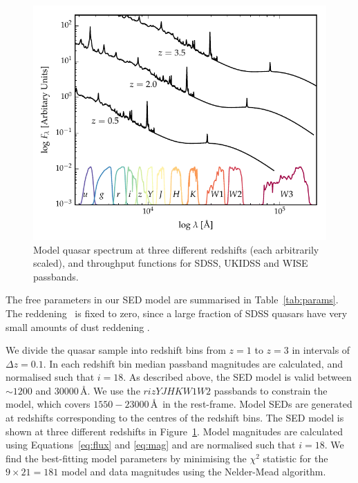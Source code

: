 \begin{figure}
  \centering
  \includegraphics[width=\textwidth]{figures/chapter05/throughput.pdf}
  \caption[{Model quasar spectrum at three different redshifts, and throughput functions for SDSS, UKIDSS and WISE passbands.}]{Model quasar spectrum at three different redshifts (each arbitrarily scaled), and throughput functions for SDSS, UKIDSS and WISE passbands.}
  \label{fig:filters}
\end{figure}

The free parameters in our SED model are summarised in Table~\ref{tab:params}. 
The reddening \ebv\, is fixed to zero, since a large fraction of SDSS quasars have very small amounts of dust reddening \citep{richards03}. 

We divide the quasar sample into redshift bins from $z=1$ to $z=3$ in intervals of $\Delta z = 0.1$.
In each redshift bin median passband magnitudes are calculated, and normalised such that $i=18$.
As described above, the SED model is valid between $\sim1200$ and $30000$\,\AA.  
We use the $rizYJHKW1W2$ passbands to constrain the model, which covers $1550-23000$\,\AA\, in the rest-frame. 
Model SEDs are generated at redshifts corresponding to the centres of the redshift bins.
The SED model is shown at three different redshifts in Figure~\ref{fig:filters}.
Model magnitudes are calculated using Equations~\ref{eq:flux} and \ref{eq:mag} and are normalised such that $i=18$.
We find the best-fitting model parameters by minimising the $\chi^2$ statistic for the $9 \times 21 = 181$ model and data magnitudes using the Nelder-Mead algorithm. 

